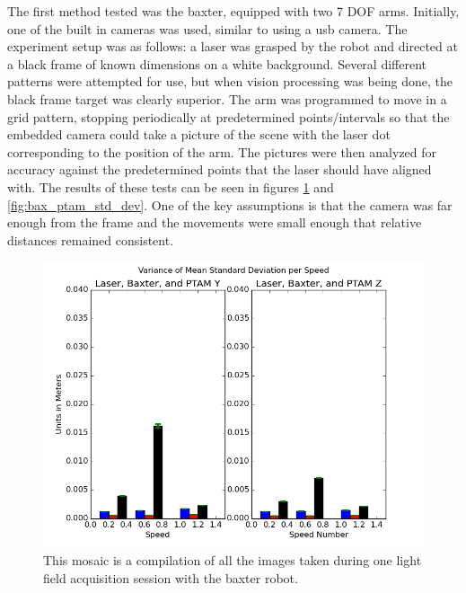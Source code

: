 \documentclass[12pt]{report}
\begin{document}
The first method tested was the baxter, equipped with two 7 DOF arms. Initially, one of the built in cameras was used, similar to using a usb camera. The experiment setup was as follows: a laser was grasped by the robot and directed at a black frame of known dimensions on a white background. Several different patterns were attempted for use, but when vision processing was being done, the black frame target was clearly superior. The arm was programmed to move in a grid pattern, stopping periodically at predetermined points/intervals so that the embedded camera could take a picture of the scene with the laser dot corresponding to the position of the arm. The pictures were then analyzed for accuracy against the predetermined points that the laser should have aligned with. The results of these tests can be seen in figures \ref{fig:bax_ptam_variance} and \ref{fig:bax_ptam_std_dev}. One of the key assumptions is that the camera was far enough from the frame and the movements were small enough that relative distances remained consistent.

\begin{figure}[!ht]
	\centering
	\includegraphics[scale=0.55]{bax_and_ptam_var.png}
	\caption{This mosaic is a compilation of all the images taken during one light field acquisition session with the baxter robot.}
	\label{fig:bax_ptam_variance}
\end{figure}
\end{document}
